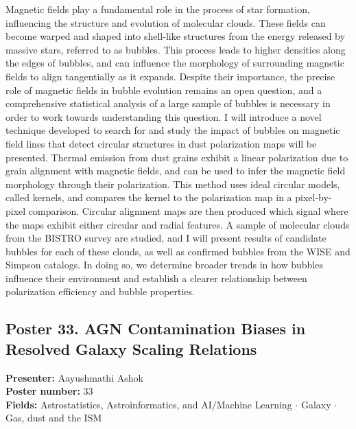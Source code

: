 Magnetic fields play a fundamental role in the process of star formation, influencing the structure and evolution of molecular clouds. These fields can become warped and shaped into shell-like structures from the energy released by massive stars, referred to as bubbles. This process leads to higher densities along the edges of bubbles, and can influence the morphology of surrounding magnetic fields to align tangentially as it expands. Despite their importance, the precise role of magnetic fields in bubble evolution remains an open question, and a comprehensive statistical analysis of a large sample of bubbles is necessary in order to work towards understanding this question. I will introduce a novel technique developed to search for and study the impact of bubbles on magnetic field lines that detect circular structures in dust polarization maps will be presented. Thermal emission from dust grains exhibit a linear polarization due to grain alignment with magnetic fields, and can be used to infer the magnetic field morphology through their polarization. This method uses ideal circular models, called kernels, and compares the kernel to the polarization map in a pixel-by-pixel comparison. Circular alignment maps are then produced which signal where the maps exhibit either circular and radial features. A sample of molecular clouds from the BISTRO survey are studied, and I will present results of candidate bubbles for each of these clouds, as well as confirmed bubbles from the WISE and Simpson catalogs. In doing so, we determine broader trends in how bubbles influence their environment and establish a clearer relationship between polarization efficiency and bubble properties.

\hypertarget{poster-abstract-talk-143}{}\label{poster-abstract-page-talk-143}
\subsection*{Poster 33. AGN Contamination Biases in Resolved Galaxy Scaling Relations}
\textbf{Presenter:} Aayushmathi Ashok\\
\textbf{Poster number:} 33\\
\textbf{Fields:} Astrostatistics, Astroinformatics, and AI/Machine Learning $\cdot$ Galaxy $\cdot$ Gas, dust and the ISM

